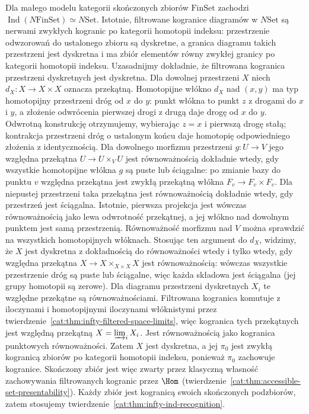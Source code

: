 \begin{przyklad}\label{cat:ex:infty-ind-sets-spaces}
Dla małego modelu kategorii skończonych zbiorów $\mathrm{FinSet}$ zachodzi $\operatorname{Ind}(N\mathrm{FinSet})\simeq N\mathrm{Set}$. Istotnie, filtrowane kogranice diagramów w $N\mathrm{Set}$ są nerwami zwykłych kogranic po kategorii homotopii indeksu: przestrzenie odwzorowań do ustalonego zbioru są dyskretne, a granica diagramu takich przestrzeni jest dyskretna i ma zbiór elementów równy zwykłej granicy po kategorii homotopii indeksu. Uzasadnijmy dokładnie, że filtrowana kogranica przestrzeni dyskretnych jest dyskretna. Dla dowolnej przestrzeni $X$ niech $d_X:X\to X\times X$ oznacza przekątną. Homotopijne włókno $d_X$ nad $(x,y)$ ma typ homotopijny przestrzeni dróg od $x$ do $y$: punkt włókna to punkt $z$ z drogami do $x$ i $y$, a złożenie odwrócenia pierwszej drogi z drugą daje drogę od $x$ do $y$. Odwrotną konstrukcję otrzymujemy, wybierając $z=x$ i pierwszą drogę stałą; kontrakcja przestrzeni dróg o ustalonym końcu daje homotopię odpowiedniego złożenia z identycznością. Dla dowolnego morfizmu przestrzeni $g:U\to V$ jego względna przekątna $U\to U\times_V U$ jest równoważnością dokładnie wtedy, gdy wszystkie homotopijne włókna $g$ są puste lub ściągalne: po zmianie bazy do punktu $v$ względna przekątna jest zwykłą przekątną włókna $F_v\to F_v\times F_v$. Dla niepustej przestrzeni taka przekątna jest równoważnością dokładnie wtedy, gdy przestrzeń jest ściągalna. Istotnie, pierwsza projekcja jest wówczas równoważnością jako lewa odwrotność przekątnej, a jej włókno nad dowolnym punktem jest samą przestrzenią. Równoważność morfizmu nad $V$ można sprawdzić na wszystkich homotopijnych włóknach. Stosując ten argument do $d_X$, widzimy, że $X$ jest dyskretna z dokładnością do równoważności wtedy i tylko wtedy, gdy względna przekątna $X\to X\times_{X\times X}X$ jest równoważnością: wówczas wszystkie przestrzenie dróg są puste lub ściągalne, więc każda składowa jest ściągalna (jej grupy homotopii są zerowe). Dla diagramu przestrzeni dyskretnych $X_i$ te względne przekątne są równoważnościami. Filtrowana kogranica komutuje z iloczynami i homotopijnymi iloczynami włóknistymi przez twierdzenie~\ref{cat:thm:infty-filtered-space-limits}, więc kogranica tych przekątnych jest względną przekątną $X=\varinjlim_i X_i$. Jest równoważnością jako kogranica punktowych równoważności. Zatem $X$ jest dyskretna, a jej $\pi_0$ jest zwykłą kogranicą zbiorów po kategorii homotopii indeksu, ponieważ $\pi_0$ zachowuje kogranice. Skończony zbiór jest więc zwarty przez klasyczną własność zachowywania filtrowanych kogranic przez $\Hom$ (twierdzenie~\ref{cat:thm:accessible-set-presentability}). Każdy zbiór jest kogranicą swoich skończonych podzbiorów, zatem stosujemy twierdzenie~\ref{cat:thm:infty-ind-recognition}.


\end{przyklad}
